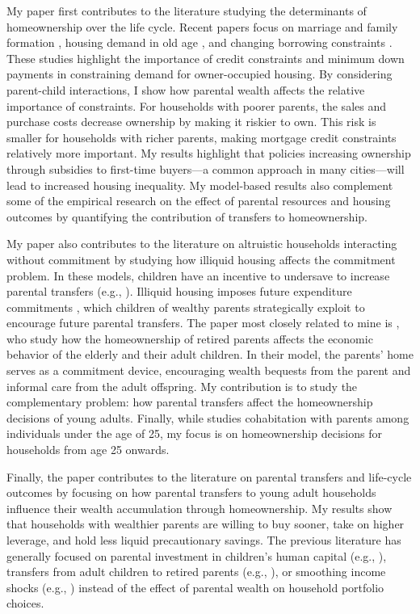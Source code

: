 \documentclass[12pt]{article}
\begin{document}
My paper first contributes to the literature studying the determinants of homeownership over the life cycle. Recent papers focus on marriage and family formation \citep{Fisher2011,Chang2024,Khorunzhina2019}, housing demand in old age \citep{McGee2019,Barczyk2020a}, and changing borrowing constraints \citep{Paz-Pardo2019,Mabille2020}. These studies highlight the importance of credit constraints and minimum down payments in constraining demand for owner-occupied housing. By considering parent-child interactions, I show how parental wealth affects the relative importance of constraints. For households with poorer parents, the sales and purchase costs decrease ownership by making it riskier to own. This risk is smaller for households with richer parents, making mortgage credit constraints relatively more important. My results highlight that policies increasing ownership through subsidies to first-time buyers---a common approach in many cities---will lead to increased housing inequality. My model-based results also complement some of the empirical research on the effect of parental resources and housing outcomes \citep[see e.g.,][ for recent work]{wold2024housing,daysal2023intergenerational,benetton2022dynastic} by quantifying the contribution of transfers to homeownership.

My paper also contributes to the literature on altruistic households interacting without commitment by studying how illiquid housing affects the commitment problem. In these models, children have an incentive to undersave to increase parental transfers (e.g., \citealp{Altonji1997a,Boar2018,Barczyk2014,Chu2020}). Illiquid housing imposes future expenditure commitments \citep{Chetty2007,Shore2010}, which children of wealthy parents strategically exploit to encourage future parental transfers. The paper most closely related to mine is \cite{Barczyk2020a}, who study how the homeownership of retired parents affects the economic behavior of the elderly and their adult children. In their model, the parents' home serves as a commitment device, encouraging wealth bequests from the parent and informal care from the adult offspring. My contribution is to study the complementary problem: how parental transfers affect the homeownership decisions of young adults. Finally, while \cite{kaplan2012moving} studies cohabitation with parents among individuals under the age of 25, my focus is on homeownership decisions for households from age 25 onwards.

Finally, the paper contributes to the literature on parental transfers and life-cycle outcomes by focusing on how parental transfers to young adult households influence their wealth accumulation through homeownership. My results show that households with wealthier parents are willing to buy sooner, take on higher leverage, and hold less liquid precautionary savings. The previous literature has generally focused on parental investment in children's human capital (e.g., \citealp{Lee2019,Daruich2018,gilraine2023public}), transfers from adult children to retired parents (e.g., \citealp{Mommaerts2016, Barczyk2018, Barczyk2020a}), or smoothing income shocks (e.g., \cite{Boar2021ReStud,fagereng2023insuring,andersen2020bailing}) instead of the effect of parental wealth on household portfolio choices.
\end{document}
